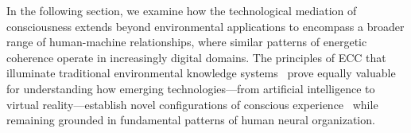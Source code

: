 In the following section, we examine how the technological mediation of consciousness extends beyond environmental applications to encompass a broader range of human-machine relationships, where similar patterns of energetic coherence operate in increasingly digital domains. The principles of ECC that illuminate traditional environmental knowledge systems~ prove equally valuable for understanding how emerging technologies—from artificial intelligence to virtual reality—establish novel configurations of conscious experience~ while remaining grounded in fundamental patterns of human neural organization.
